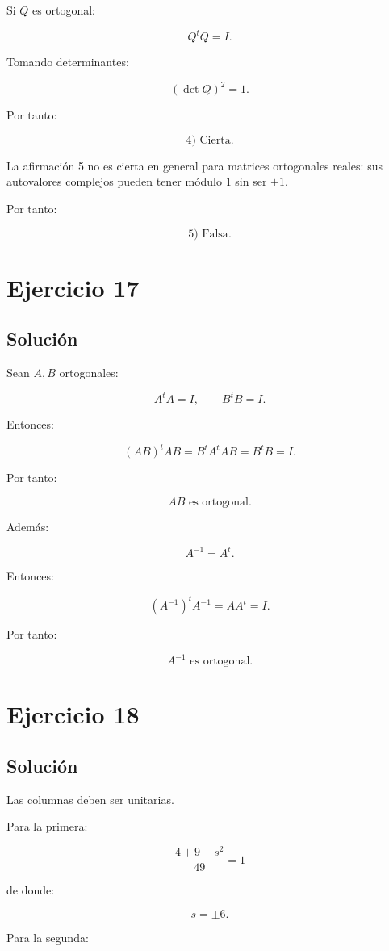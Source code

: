 \documentclass[11pt,a4paper]{article}
\begin{document}
Si $Q$ es ortogonal:

\[
Q^tQ=I.
\]

Tomando determinantes:

\[
(\det Q)^2=1.
\]

Por tanto:

\[
\boxed{\text{4) Cierta}.}
\]

La afirmación 5 no es cierta en general para matrices ortogonales reales: sus autovalores complejos pueden tener módulo $1$ sin ser $\pm1$.

Por tanto:

\[
\boxed{\text{5) Falsa}.}
\]

\section{Ejercicio 17}
\subsection{Solución}

Sean $A,B$ ortogonales:

\[
A^tA=I,
\qquad
B^tB=I.
\]

Entonces:

\[
(AB)^tAB
=
B^tA^tAB
=
B^tB
=
I.
\]

Por tanto:

\[
\boxed{AB\text{ es ortogonal}.}
\]

Además:

\[
A^{-1}=A^t.
\]

Entonces:

\[
(A^{-1})^tA^{-1}
=
AA^t
=
I.
\]

Por tanto:

\[
\boxed{A^{-1}\text{ es ortogonal}.}
\]

\section{Ejercicio 18}
\subsection{Solución}

Las columnas deben ser unitarias.

Para la primera:

\[
\frac{4+9+s^2}{49}=1
\]

de donde:

\[
s=\pm6.
\]

Para la segunda:
\end{document}
